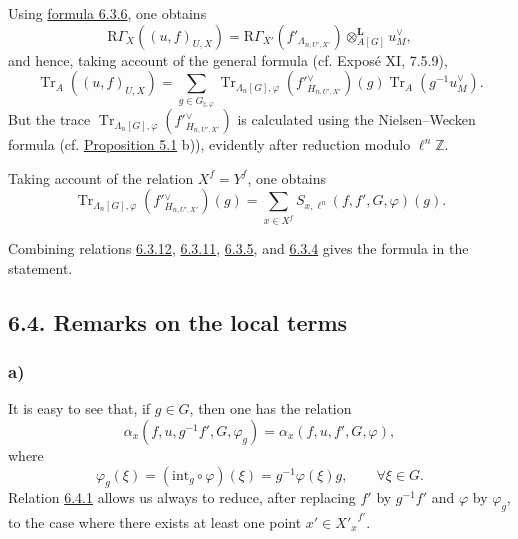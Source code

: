 \documentclass[11pt]{article}
\providecommand{\Tr}{\operatorname{Tr}}
\providecommand{\Tr}{\operatorname{Tr}}
\providecommand{\Tr}{\operatorname{Tr}}
\providecommand{\Tr}{\operatorname{Tr}}
\providecommand{\RG}{\mathrm R\Gamma}
\providecommand{\La}{\Lambda}
\providecommand{\Tr}{\operatorname{Tr}}
\begin{document}
Using \hyperref[sga5:XII:equation:6.3.6]{formula 6.3.6}, one obtains
\begin{equation}
\tag{6.3.10}\label{sga5:XII:equation:6.3.10}
\RG_X((u,f)_{U,X})=\RG_{X'}(f'_{\La_{n,U',X'}})\otimes_{A[G]}^{\mathbf L}u_M^\vee,
\end{equation}
and hence, taking account of the general formula (cf. Exposé XI, 7.5.9),
\begin{equation}
\tag{6.3.11}\label{sga5:XII:equation:6.3.11}
\Tr_A((u,f)_{U,X})=
\sum_{g\in G_{\natural,\varphi}}\Tr_{\La_n[G],\varphi}(f'{}^\vee_{H_{n,U',X'}})(g)\Tr_A(g^{-1}u_M^\vee).
\end{equation}
But the trace $\Tr_{\La_n[G],\varphi}(f'{}^\vee_{H_{n,U',X'}})$ is calculated using the Nielsen--Wecken formula (cf. \hyperref[sga5:XII:proposition:5.1]{Proposition 5.1} b)), evidently after reduction modulo $\ell^n\mathbb Z$.

Taking account of the relation $X^f=Y^f$, one obtains
\begin{equation}\tag{6.3.12}\label{sga5:XII:equation:6.3.12}
\Tr_{\La_n[G],\varphi}(f'{}^\vee_{H_{n,U',X'}})(g)=\sum_{x\in X^f}S_{x,\ell^n}(f,f',G,\varphi)(g).
\end{equation}

Combining relations \hyperref[sga5:XII:equation:6.3.12]{6.3.12}, \hyperref[sga5:XII:equation:6.3.11]{6.3.11}, \hyperref[sga5:XII:equation:6.3.5]{6.3.5}, and \hyperref[sga5:XII:equation:6.3.4]{6.3.4} gives the formula in the statement.

\subsection*{6.4. Remarks on the local terms}\label{sga5:XII:subsection:6.4}
\subsubsection*{a)} It is easy to see that, if $g\in G$, then one has the relation
\begin{equation}\tag{6.4.1}\label{sga5:XII:equation:6.4.1}
\alpha_x(f,u,g^{-1}f',G,\varphi_g)
=
\alpha_x(f,u,f',G,\varphi),
\end{equation}
where
\begin{equation}\tag{6.4.2}\label{sga5:XII:equation:6.4.2}
\varphi_g(\xi)=(\mathrm{int}_g\circ\varphi)(\xi)=g^{-1}\varphi(\xi)g,
\qquad \forall\xi\in G.
\end{equation}
Relation \hyperref[sga5:XII:equation:6.4.1]{6.4.1} allows us always to reduce, after replacing $f'$ by $g^{-1}f'$ and $\varphi$ by $\varphi_g$, to the case where there exists at least one point $x'\in {X'_x}^{f'}$.
\end{document}
